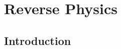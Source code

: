 \documentclass[11pt,letterpaper,fleqn]{memoir}
\begin{document}
\part*{Reverse Physics}

\tableofcontents* 

\cleardoublepage 
\mainmatter

\chapter{Introduction}





	
\end{document}
